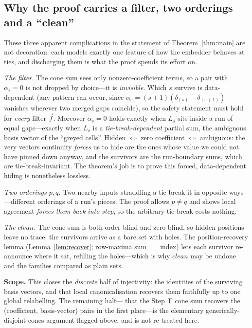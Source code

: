 \subsection*{Why the proof carries a filter, two orderings and a ``clean''}

These three apparent complications in the statement of Theorem~\ref{thm:main}
are not decoration: each models exactly one feature of how the embedder behaves
at ties, and discharging them is what the proof spends its effort on.

\emph{The filter.}  The cone sum sees only nonzero-coefficient terms, so a pair
with $\alpha_s=0$ is not dropped by choice---it is \emph{invisible}.  Which $s$
survive is data-dependent (any pattern can occur, since
$\alpha_s=(s{+}1)(\delta_{(s)}-\delta_{(s+1)})$ vanishes wherever two merged
gaps coincide), so the safety statement must hold for \emph{every} filter
$\vec f$.  Moreover $\alpha_s=0$ holds exactly when $L_s$ sits inside a run of
equal gaps---exactly when $L_s$ is a \emph{tie-break-dependent} partial sum, the
ambiguous basis vector of the ``greyed cells''.  Hidden $\iff$ zero coefficient
$\iff$ ambiguous: the very vectors continuity \emph{forces} us to hide are the
ones whose value we could not have pinned down anyway, and the survivors are the
run-boundary sums, which are tie-break-invariant.  The theorem's job is to
prove this forced, data-dependent hiding is nonetheless lossless.

\emph{Two orderings $p,q$.}  Two nearby inputs straddling a tie break it in
opposite ways---different orderings of a run's pieces.  The proof allows
$p\neq q$ and shows local agreement \emph{forces them back into step}, so the
arbitrary tie-break costs nothing.

\emph{The $clean$.}  The cone sum is both order-blind and zero-blind, so hidden
positions leave no trace: the survivors arrive as a bare set with holes.  The
position-recovery lemma (Lemma~\ref{lem:recover}; row-maxima sum $=$ index)
lets each survivor re-announce where it sat, refilling the holes---which is why
$clean$ may be undone and the families compared as plain sets.

\begin{tcolorbox}[notebox]
\textbf{Scope.}  This closes the \emph{discrete} half of injectivity: the
identities of the surviving basis vectors, and that local canonicalisation
recovers them faithfully up to one global relabelling.  The remaining half---
that the Step~F cone sum recovers the (coefficient, basis-vector) pairs in the
first place---is the elementary generically-disjoint-cones argument flagged
above, and is not re-treated here.
\end{tcolorbox}

